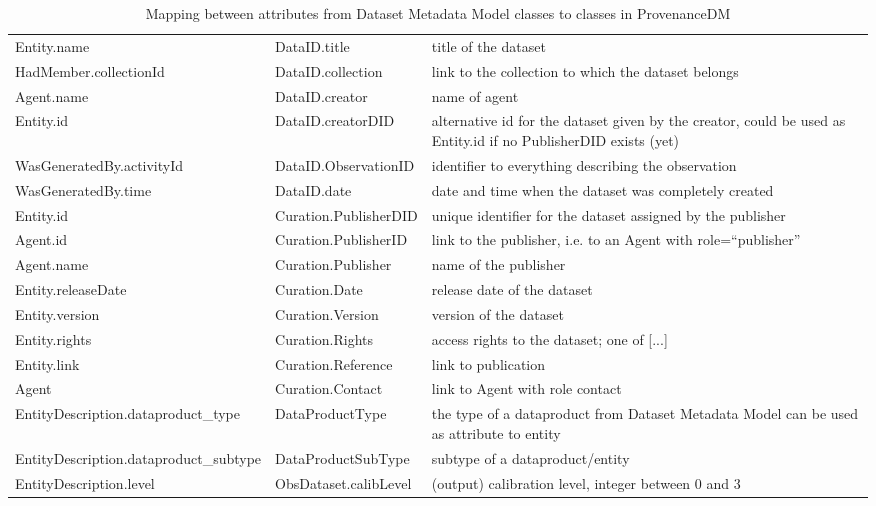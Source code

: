 \begin{table}[h]
\small
{}\textwidth
\begin{tabulary}{1.0\textwidth}{@{}Llp{4cm}@{}}
\toprule
{} &  & \\
\midrule
Entity.name                & DataID.title         & title of the dataset\\
HadMember.collectionId     & DataID.collection    & link to the collection to which the dataset belongs\\
Agent.name                 & DataID.creator       & name of agent\\
Entity.id                  & DataID.creatorDID    &  alternative id for the dataset given by the creator, could be used as Entity.id if no PublisherDID exists (yet)\\
WasGeneratedBy.activityId  & DataID.ObservationID & identifier to everything describing the observation\\
WasGeneratedBy.time        & DataID.date          & date and time when the dataset was completely created\\
Entity.id                & Curation.PublisherDID  & unique identifier for the dataset assigned by the publisher\\
Agent.id                 & Curation.PublisherID   & link to the publisher, i.e. to an Agent with role=``publisher''\\
Agent.name               & Curation.Publisher     & name of the publisher\\
Entity.releaseDate       & Curation.Date          & release date of the dataset\\
Entity.version           & Curation.Version       & version of the dataset\\
Entity.rights            & Curation.Rights        & access rights to the dataset; one of [...]\\
Entity.link              & Curation.Reference     & link to publication\\
Agent                    & Curation.Contact       & link to Agent with role contact\\
EntityDescription.dataproduct\_type & DataProductType  & the type of a dataproduct from Dataset Metadata Model can be used as attribute to entity\\
EntityDescription.dataproduct\_subtype & DataProductSubType & subtype of a \mbox{dataproduct}/entity\\
EntityDescription.level & ObsDataset.calibLevel  & (output) calibration level, integer between 0 and 3\\\hline
\bottomrule
\end{tabulary}
\caption{Mapping between attributes from Dataset Metadata Model classes to classes in ProvenanceDM}
\label{tab:datasetmapping}
\end{table}


